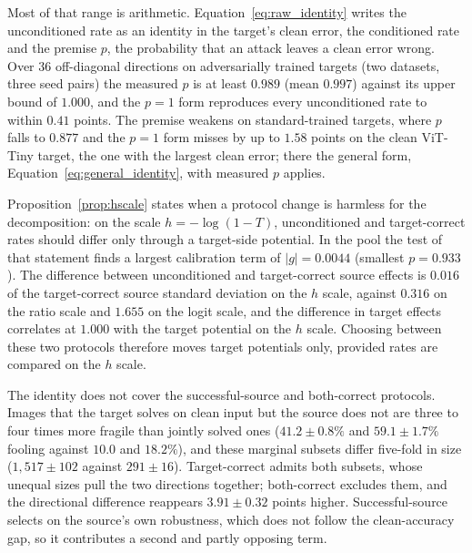 Most of that range is arithmetic. Equation~\eqref{eq:raw_identity} writes the unconditioned rate as an identity in the target's clean error, the conditioned rate and the premise $p$, the probability that an attack leaves a clean error wrong. Over $36$ off-diagonal directions on adversarially trained targets (two datasets, three seed pairs) the measured $p$ is at least $0.989$ (mean $0.997$) against its upper bound of $1.000$, and the $p = 1$ form reproduces every unconditioned rate to within $0.41$ points. The premise weakens on standard-trained targets, where $p$ falls to $0.877$ and the $p = 1$ form misses by up to $1.58$ points on the clean ViT-Tiny target, the one with the largest clean error; there the general form, Equation~\eqref{eq:general_identity}, with measured $p$ applies.

Proposition~\ref{prop:hscale} states when a protocol change is harmless for the decomposition: on the scale $h = -\log(1 - T)$, unconditioned and target-correct rates should differ only through a target-side potential. In the pool the test of that statement finds a largest calibration term of $|g| = 0.0044$ (smallest $p = 0.933$). The difference between unconditioned and target-correct source effects is $0.016$ of the target-correct source standard deviation on the $h$ scale, against $0.316$ on the ratio scale and $1.655$ on the logit scale, and the difference in target effects correlates at $1.000$ with the target potential on the $h$ scale. Choosing between these two protocols therefore moves target potentials only, provided rates are compared on the $h$ scale.

The identity does not cover the successful-source and both-correct protocols. Images that the target solves on clean input but the source does not are three to four times more fragile than jointly solved ones ($41.2\pm0.8\%$ and $59.1\pm1.7\%$ fooling against $10.0$ and $18.2\%$), and these marginal subsets differ five-fold in size ($1{,}517\pm102$ against $291\pm16$). Target-correct admits both subsets, whose unequal sizes pull the two directions together; both-correct excludes them, and the directional difference reappears $3.91\pm0.32$ points higher. Successful-source selects on the source's own robustness, which does not follow the clean-accuracy gap, so it contributes a second and partly opposing term.

